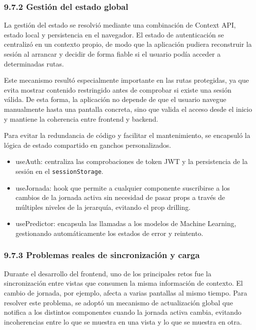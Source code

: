 \subsubsection{9.7.2 Gestión del estado global}
 
La gestión del estado se resolvió mediante una combinación de Context API, estado local y persistencia en el navegador. El estado de autenticación se
centralizó en un contexto propio, de modo que la aplicación pudiera reconstruir la sesión al arrancar y decidir de forma fiable si el usuario podía acceder a determinadas rutas.
 
Este mecanismo resultó especialmente importante en las rutas protegidas, ya que evita mostrar contenido restringido antes de comprobar si existe una
sesión válida. De esta forma, la aplicación no depende de que el usuario navegue manualmente hasta una pantalla concreta, sino que valida el acceso
desde el inicio y mantiene la coherencia entre frontend y backend.
 
Para evitar la redundancia de código y facilitar el mantenimiento, se encapsuló la lógica de estado compartido en ganchos personalizados.
 
\begin{itemize}
\item useAuth: centraliza las comprobaciones de token JWT y la persistencia de la sesión en el \texttt{sessionStorage}.
 
\item useJornada: hook que permite a cualquier componente suscribirse a los cambios de la jornada activa sin necesidad de pasar props a través de múltiples niveles de la jerarquía, evitando el prop drilling.
 
\item usePredictor: encapsula las llamadas a los modelos de Machine Learning, gestionando automáticamente los estados de error y reintento.
\end{itemize}
 
\subsubsection{9.7.3 Problemas reales de sincronización y carga}
 
Durante el desarrollo del frontend, uno de los principales retos fue la sincronización entre vistas que consumen la misma información de contexto.
El cambio de jornada, por ejemplo, afecta a varias pantallas al mismo tiempo. Para resolver este problema, se adoptó un mecanismo de actualización
global que notifica a los distintos componentes cuando la jornada activa cambia, evitando incoherencias entre lo que se muestra en una vista y lo que se muestra en otra.
 
